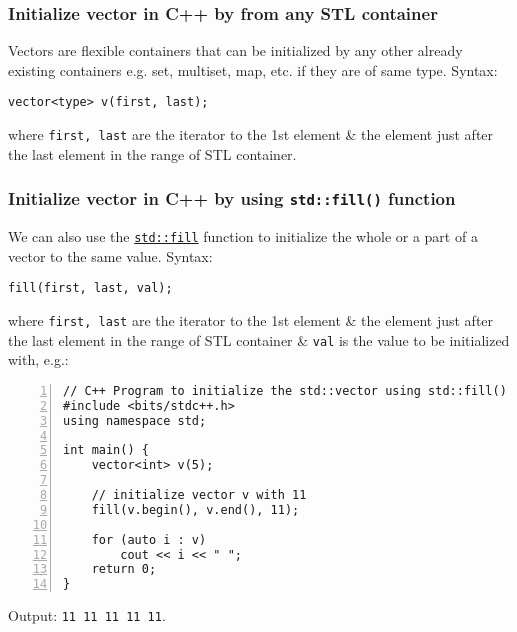 \documentclass{article}
\begin{document}

\subsubsection{Initialize vector in C++ by from any STL container}
Vectors are flexible containers that can be initialized by any other already existing containers e.g. set, multiset, map, etc. if they are of same type. Syntax:
\begin{verbatim}
vector<type> v(first, last);
\end{verbatim}
where {\tt first, last} are the iterator to the 1st element \& the element just after the last element in the range of STL container.


\subsubsection{Initialize vector in C++ by using {\tt std::fill()} function}
We can also use the \href{https://www.geeksforgeeks.org/fill-and-fill_n-functions-in-c-stl/}{\tt std::fill} function to initialize the whole or a part of a vector to the same value. Syntax:
\begin{verbatim}
fill(first, last, val);
\end{verbatim}
where {\tt first, last} are the iterator to the 1st element \& the element just after the last element in the range of STL container \& {\tt val} is the value to be initialized with, e.g.:
\begin{Verbatim}[numbers=left,xleftmargin=5mm]
// C++ Program to initialize the std::vector using std::fill() method
#include <bits/stdc++.h>
using namespace std;

int main() {
    vector<int> v(5);
	
    // initialize vector v with 11
    fill(v.begin(), v.end(), 11);
	
    for (auto i : v)
        cout << i << " ";
    return 0;
}
\end{Verbatim}
Output: {\tt11 11 11 11 11}.

\end{document}
